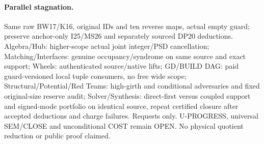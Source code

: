 \documentclass[11pt]{article}
\begin{document}
\paragraph{Parallel stagnation.}
Same raw BW17/K16, original IDs and ten reverse maps, actual empty guard; preserve anchor-only I25/MS26 and separately sourced DP20 deductions. Algebra/Hub: higher-scope actual joint integer/PSD cancellation; Matching/Interfaces: genuine occupancy/syndrome on same source and exact support; Wheels: authenticated source/native lifts; GD/BUILD DAG: paid guard-versioned local tuple consumers, no free wide scope; Structural/Potential/Red Teams: high-girth and conditional adversaries and fixed original-size reserve audit; Solver/Synthesis: direct-first versus coupled support and signed-mode portfolio on identical source, repeat certified closure after accepted deductions and charge failures. Requests only. U-PROGRESS, universal SEM/CLOSE and unconditional COST remain OPEN. No physical quotient reduction or public proof claimed.
\end{document}
